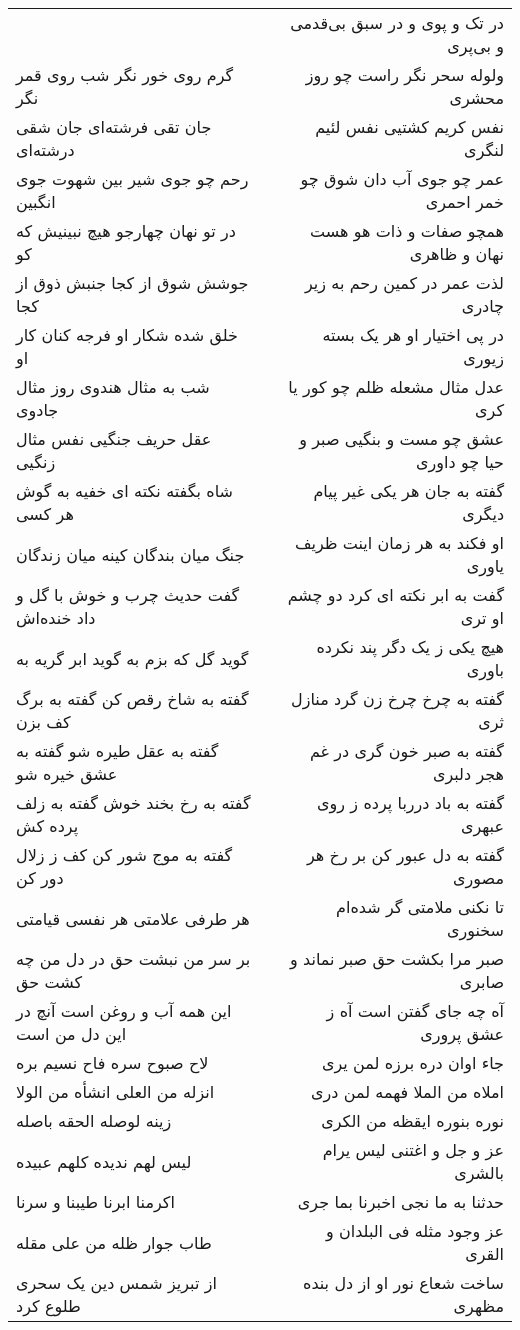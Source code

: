 \begin{center}
\begin{longtable}{l p{0.5cm} r}
&&
در تک و پوی و در سبق بی‌قدمی و بی‌پری
\\
گرم روی خور نگر شب روی قمر نگر
&&
ولوله سحر نگر راست چو روز محشری
\\
جان تقی فرشته‌ای جان شقی درشته‌ای
&&
نفس کریم کشتیی نفس لئیم لنگری
\\
رحم چو جوی شیر بین شهوت جوی انگبین
&&
عمر چو جوی آب دان شوق چو خمر احمری
\\
در تو نهان چهارجو هیچ نبینیش که کو
&&
همچو صفات و ذات هو هست نهان و ظاهری
\\
جوشش شوق از کجا جنبش ذوق از کجا
&&
لذت عمر در کمین رحم به زیر چادری
\\
خلق شده شکار او فرجه کنان کار او
&&
در پی اختیار او هر یک بسته زیوری
\\
شب به مثال هندوی روز مثال جادوی
&&
عدل مثال مشعله ظلم چو کور یا کری
\\
عقل حریف جنگیی نفس مثال زنگیی
&&
عشق چو مست و بنگیی صبر و حیا چو داوری
\\
شاه بگفته نکته ای خفیه به گوش هر کسی
&&
گفته به جان هر یکی غیر پیام دیگری
\\
جنگ میان بندگان کینه میان زندگان
&&
او فکند به هر زمان اینت ظریف یاوری
\\
گفت حدیث چرب و خوش با گل و داد خنده‌اش
&&
گفت به ابر نکته ای کرد دو چشم او تری
\\
گوید گل که بزم به گوید ابر گریه به
&&
هیچ یکی ز یک دگر پند نکرده باوری
\\
گفته به شاخ رقص کن گفته به برگ کف بزن
&&
گفته به چرخ چرخ زن گرد منازل ثری
\\
گفته به عقل طیره شو گفته به عشق خیره شو
&&
گفته به صبر خون گری در غم هجر دلبری
\\
گفته به رخ بخند خوش گفته به زلف پرده کش
&&
گفته به باد درربا پرده ز روی عبهری
\\
گفته به موج شور کن کف ز زلال دور کن
&&
گفته به دل عبور کن بر رخ هر مصوری
\\
هر طرفی علامتی هر نفسی قیامتی
&&
تا نکنی ملامتی گر شده‌ام سخنوری
\\
بر سر من نبشت حق در دل من چه کشت حق
&&
صبر مرا بکشت حق صبر نماند و صابری
\\
این همه آب و روغن است آنچ در این دل من است
&&
آه چه جای گفتن است آه ز عشق پروری
\\
لاح صبوح سره فاح نسیم بره
&&
جاء اوان دره برزه لمن یری
\\
انزله من العلی انشأه من الولا
&&
املاه من الملا فهمه لمن دری
\\
زینه لوصله الحقه باصله
&&
نوره بنوره ایقظه من الکری
\\
لیس لهم ندیده کلهم عبیده
&&
عز و جل و اغتنی لیس یرام بالشری
\\
اکرمنا ابرنا طیبنا و سرنا
&&
حدثنا به ما نجی اخبرنا بما جری
\\
طاب جوار ظله من علی مقله
&&
عز وجود مثله فی البلدان و القری
\\
از تبریز شمس دین یک سحری طلوع کرد
&&
ساخت شعاع نور او از دل بنده مظهری
\\
\end{longtable}
\end{center}
